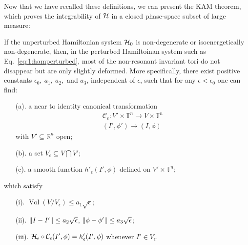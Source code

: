 Now that we have recalled these definitions, we can present the KAM theorem, which proves the integrability of $\mathcal{H}$ in a closed phase-space subset of large measure:
\begin{theorem}
If the unperturbed Hamiltonian system $\mathcal{H}_0$ is non-degenerate or isoenergetically non-degenerate, then, in the perturbed Hamiltoinan system such as Eq.~\eqref{eq:1:hamperturbed}, most of the non-resonant invariant tori do not disappear but are only slightly deformed. More specifically, there exist positive constants $\epsilon_0,\ a_1,\ a_2,$ and $a_3$, independent of $\epsilon$, such that for any $\epsilon < \epsilon_0$ one can find:
\begin{enumerate}
    \item [(a).] a near to identity canonical transformation
    \begin{equation}
        \begin{array}{r}
        \mathcal{C}_\epsilon: V'\times\mathbb{T}^{n} \longrightarrow V\times\mathbb{T}^n \\
        (I', \phi') \longrightarrow(I, \phi)
        \end{array}
    \end{equation}
    with $V' \subseteq \mathbb{R}^n$ open;
    \item [(b).] a set $V_\epsilon \subseteq V \bigcap V'$;
    \item [(c).] a smooth function $h'_\epsilon(I', \phi)$ defined on $V'\times \mathbb{T}^n$;
\end{enumerate}
which satisfy
\begin{enumerate}
    \item [(i).] $\operatorname{Vol}(V/V_\epsilon) \leq a_1\sqrt{\epsilon}$;
    \item [(ii).] $\norm{I-I'}\leq a_2 \sqrt{\epsilon}$, $\norm{\phi - \phi'} \leq a_3 \sqrt{\epsilon}$;
    \item [(iii).] $\mathcal{H}_\epsilon \circ \mathcal{C}_\epsilon (I', \phi) = h'_\epsilon (I', \phi)$ whenever $I'\in V_\epsilon$.
\end{enumerate}

\end{theorem}

